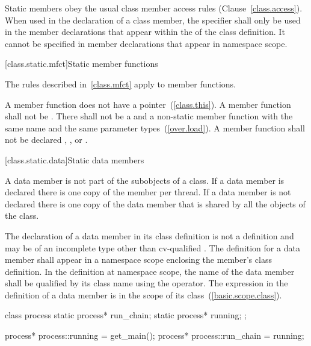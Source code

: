 \pnum
Static members obey the usual class member access rules
(Clause~\ref{class.access}). When used in the declaration of a class
member, the  specifier shall only be used in the member
declarations that appear within the  of
the class definition.
\enternote
It cannot be specified in member declarations that appear in namespace scope.
\exitnote

[class.static.mfct]{Static member functions}
%

\pnum
\enternote
The rules described in~\ref{class.mfct} apply to  member
functions.
\exitnote

\pnum
\enternote
A  member function does not have a 
pointer~(\ref{class.this}).
\exitnote
A  member function shall not be . There
shall not be a  and a non-static member function with the
same name and the same parameter types~(\ref{over.load}). A
 member function shall not be declared ,
, or .

[class.static.data]{Static data members}
%

\pnum
A  data member is not part of the subobjects of a class. If a
 data member is declared  there is one copy of
the member per thread. If a  data member is not declared
 there is one copy of the data member that is shared by all
the objects of the class.

\pnum
{}%
%
The declaration of a  data member in its class definition
is not a definition and may be of an incomplete type other than
cv-qualified . The definition for a  data
member shall appear in a namespace scope enclosing the member's class
definition.
%
In the definition at namespace scope, the name of the 
data member shall be qualified by its class name using the \tcode{::}
operator. The  expression in the definition of a
 data member is in the scope of its
class~(\ref{basic.scope.class}).
%
\enterexample

\begin{codeblock}
class process {
  static process* run_chain;
  static process* running;
};

process* process::running = get_main();
process* process::run_chain = running;
\end{codeblock}

